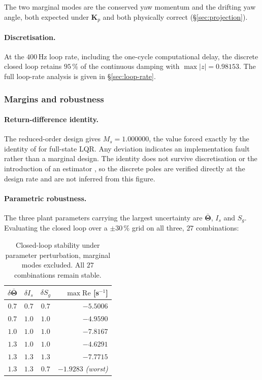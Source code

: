 The two marginal modes are the conserved yaw momentum and the drifting yaw
angle, both expected under $\bm{K}_p$ and both physically correct
(\S\ref{sec:projection}).

\paragraph{Discretisation.} At the $400$\,Hz loop rate, including the
one-cycle computational delay, the discrete closed loop retains $95\,\%$ of
the continuous damping with $\max|z| = 0.98153$. The full loop-rate analysis
is given in \S\ref{sec:loop-rate}.

\subsubsection{Margins and robustness}
\label{sec:margins}

\paragraph{Return-difference identity.} The reduced-order design gives
$M_s = 1.000000$, the value forced exactly by the identity of
\cite{kalman1964optimal} for full-state LQR. Any deviation indicates an
implementation fault rather than a marginal design. The identity does not
survive discretisation or the introduction of an estimator
\cite{doyle1978guaranteed}, so the discrete poles are verified directly at
the design rate and are not inferred from this figure.

\paragraph{Parametric robustness.} The three plant parameters carrying the
largest uncertainty are $\bar{\bm{\Theta}}$, $I_s$ and $S_g$. Evaluating the
closed loop over a $\pm 30\,\%$ grid on all three, $27$ combinations:

\begin{table}[htbp]
\centering
\small
\begin{tabular}{@{}cccr@{}}
\toprule
$\delta\bar{\bm{\Theta}}$ & $\delta I_s$ & $\delta S_g$ & $\max\mathrm{Re}$ [s$^{-1}$]\\
\midrule
$0.7$ & $0.7$ & $0.7$ & $-5.5006$\\
$0.7$ & $1.0$ & $1.0$ & $-4.9590$\\
$1.0$ & $1.0$ & $1.0$ & $-7.8167$\\
$1.3$ & $1.0$ & $1.0$ & $-4.6291$\\
$1.3$ & $1.3$ & $1.3$ & $-7.7715$\\
$1.3$ & $1.3$ & $0.7$ & $\bm{-1.9283}$ \emph{(worst)}\\
\bottomrule
\end{tabular}
\caption{Closed-loop stability under parameter perturbation, marginal modes
excluded. All $27$ combinations remain stable.}
\label{tab:robustness}
\end{table}

